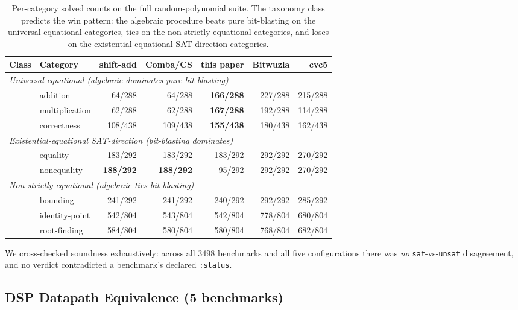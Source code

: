 \documentclass[runningheads]{llncs}
\begin{document}
\begin{table}[ht]
\caption{Per-category solved counts on the full random-polynomial
suite. The taxonomy class predicts the win pattern: the
algebraic procedure beats pure bit-blasting on the
universal-equational categories, ties on the
non-strictly-equational categories, and loses on the
existential-equational SAT-direction categories.}
\label{tab:random-poly-by-category}
\centering
\small
\begin{tabular}{llrrrrr}
\toprule
Class & Category & shift-add & Comba/CS & this paper & Bitwuzla & cvc5 \\
\midrule
\multicolumn{7}{l}{\emph{Universal-equational (algebraic dominates pure bit-blasting)}} \\
& addition       & 64/288  & 64/288  & \textbf{166/288} & 227/288 & 215/288 \\
& multiplication & 62/288  & 62/288  & \textbf{167/288} & 192/288 & 114/288 \\
& correctness    & 108/438 & 109/438 & \textbf{155/438} & 180/438 & 162/438 \\
\midrule
\multicolumn{7}{l}{\emph{Existential-equational SAT-direction (bit-blasting dominates)}} \\
& equality       & 183/292 & 183/292 & 183/292 & 292/292 & 270/292 \\
& nonequality    & \textbf{188/292} & \textbf{188/292} & 95/292  & 292/292 & 270/292 \\
\midrule
\multicolumn{7}{l}{\emph{Non-strictly-equational (algebraic ties bit-blasting)}} \\
& bounding       & 241/292 & 241/292 & 240/292 & 292/292 & 285/292 \\
& identity-point & 542/804 & 543/804 & 542/804 & 778/804 & 680/804 \\
& root-finding   & 584/804 & 580/804 & 580/804 & 768/804 & 682/804 \\
\bottomrule
\end{tabular}
\end{table}

We cross-checked soundness exhaustively: across all 3498
benchmarks and all five configurations there was \emph{no}
\texttt{sat}-vs-\texttt{unsat} disagreement, and no verdict
contradicted a benchmark's declared \texttt{:status}.

\subsection{DSP Datapath Equivalence (5 benchmarks)}
\label{sec:eval-dsp}
\end{document}
